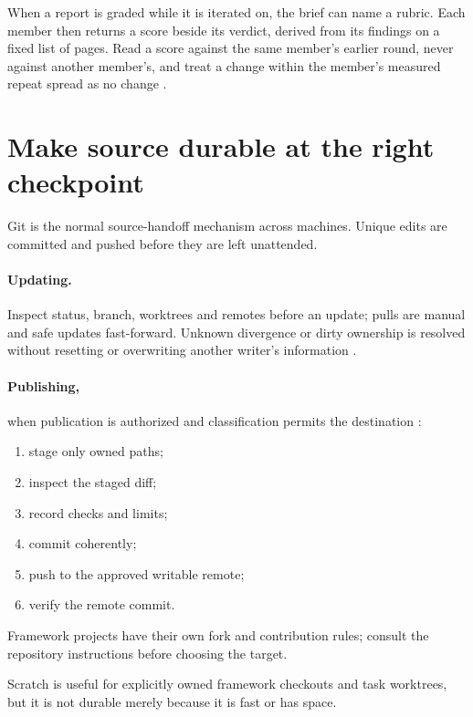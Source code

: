 When a report is graded while it is iterated on, the brief can name a rubric. Each member
then returns a score beside its verdict, derived from its findings on a fixed list of
pages. Read a score against the same member's earlier round, never against another
member's, and treat a change within the member's measured repeat spread as no change
\cite[The brief; Record]{skill:council}.

\section{Make source durable at the right checkpoint}

\begin{headline}
  Git is the normal source-handoff mechanism across machines. Unique edits are committed
  and pushed before they are left unattended.
\end{headline}

\paragraph{Updating.} Inspect status, branch, worktrees and remotes before an update; pulls
are manual and safe updates fast-forward. Unknown divergence or dirty ownership is
resolved without resetting or overwriting another writer's information \cite[Update
  safely]{skill:git}.

\paragraph{Publishing,} when publication is authorized and classification permits the
destination \cite[Commit and hand off; Material you must not publish]{skill:git}:
\begin{enumerate}
  \item stage only owned paths;
  \item inspect the staged diff;
  \item record checks and limits;
  \item commit coherently;
  \item push to the approved writable remote;
  \item verify the remote commit.
\end{enumerate}
Framework projects have their own fork and contribution rules; consult the repository
instructions before choosing the target.

Scratch is useful for explicitly owned framework checkouts and task worktrees, but it is
not durable merely because it is fast or has space.

